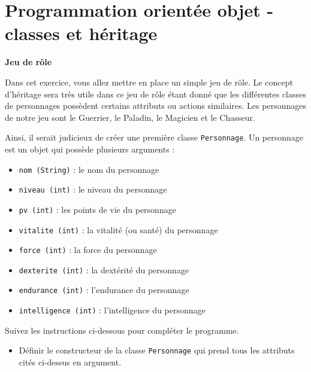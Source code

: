 \section{Programmation orientée objet - classes et héritage}

\begin{Exercice}[15 minutes]\textbf{Jeu de rôle}

    
    Dans cet exercice, vous allez mettre en place un simple jeu de rôle. Le concept d’héritage sera très utile dans ce jeu de rôle étant donné que les différentes classes de personnages possèdent certains attributs ou actions similaires. Les personnages de notre jeu sont le Guerrier, le Paladin, le Magicien et le Chasseur. 
    
    Ainsi, il serait judicieux de créer une première classe \lstinline{Personnage}. Un personnage est un objet qui possède plusieurs arguments :
    \begin{itemize}
        \item \lstinline{nom (String)} : le nom du personnage
        \item \lstinline{niveau (int)} : le niveau du personnage
        \item \lstinline{pv (int)} : les points de vie du personnage
        \item \lstinline{vitalite (int)} : la vitalité (ou santé) du personnage
        \item \lstinline{force (int)} : la force du personnage
        \item \lstinline{dexterite (int)} : la dextérité du personnage
        \item \lstinline{endurance (int)} : l’endurance du personnage
        \item \lstinline{intelligence (int)} : l’intelligence du personnage\\
    \end{itemize}
    
    Suivez les instructions ci-dessous pour compléter le programme.
    
    \begin{itemize}
        \item Définir le constructeur de la classe \lstinline{Personnage} qui prend tous les attributs cités ci-dessus en argument. 
        

\end{itemize}
\end{Exercice}
